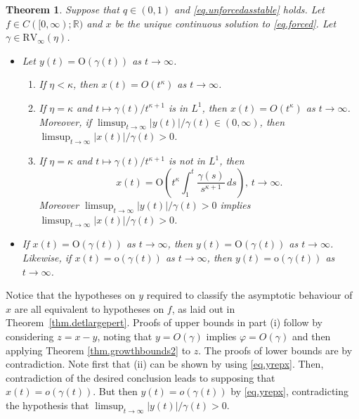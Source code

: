\documentclass[a4paper,10pt,reqno]{amsart}
\numberwithin{equation}{section}
\newtheorem{theorem}{Theorem}
\theoremstyle{definition}
\theoremstyle{remark}
\DeclareMathOperator{\1}{\mathbbm 1}
\begin{document}
\begin{theorem} \label{thm.smallstochpert}
Suppose that $q\in (0,1)$ and \eqref{eq.unforcedasstable} holds. Let $f\in C([0,\infty);\mathbb{R})$ and $x$ be the unique continuous solution to \eqref{eq.forced}. Let $\gamma\in \text{RV}_\infty(\eta)$. 
\begin{itemize}
	\item[(i)] Let $y(t)=\text{O}(\gamma(t))$ as $t\to\infty$.
	\begin{enumerate}
		\item[(A)] 
		If $\eta< \kappa$, then $x(t)=O(t^\kappa)$ as $t\to\infty$.
		\item[(B)] If $\eta=\kappa$ and  $t\mapsto \gamma(t)/t^{\kappa+1}$ is in $L^1$, then 
		$x(t)=O(t^\kappa)$ as $t\to\infty$.
		Moreover, if $\limsup_{t\to\infty} |y(t)|/\gamma(t)\in (0,\infty)$, then $\limsup_{t\to\infty} |x(t)|/\gamma(t)>0$.
		\item[(C)] If $\eta=\kappa$ and  $t\mapsto\gamma(t)/t^{\kappa+1}$ is not in $L^1$, then 
		\[
		x(t)=\text{O}\left(t^\kappa\int_1^t \frac{\gamma(s)}{s^{\kappa+1}}\,ds\right), \,t\to\infty.
		\]
		Moreover $\limsup_{t\to\infty} |y(t)|/\gamma(t)>0$ implies  $\limsup_{t\to\infty} |x(t)|/\gamma(t)>0$.  
	\end{enumerate}  
	\item[(ii)] \hspace{0.1in} If $x(t)=\text{O}(\gamma(t))$ as $t\to\infty$, then $y(t)=\text{O}(\gamma(t))$ as $t\to\infty$. Likewise, if $x(t)=\text{o}(\gamma(t))$ as $t\to\infty$, then $y(t)=\text{o}(\gamma(t))$ as $t\to\infty$.   
\end{itemize}
\end{theorem}
Notice that the hypotheses on $y$ required to classify the asymptotic behaviour of $x$ are all equivalent to hypotheses on  $f$, as laid out in Theorem~\ref{thm.detlargepert}. Proofs of upper bounds in part (i) follow by considering $z=x-y$, noting that $y=O(\gamma)$ implies $\varphi=O(\gamma)$ and then applying Theorem \ref{thm.growthbounds2} to $z$. The proofs of lower bounds are by contradiction. Note first that (ii) can be shown by using \eqref{eq.yrepx}. Then, contradiction of the desired conclusion leads to supposing that $x(t)=o(\gamma(t))$. But then $y(t)=o(\gamma(t))$ by \eqref{eq.yrepx}, contradicting the hypothesis that $\limsup_{t\to\infty} |y(t)|/\gamma(t)>0$.
\end{document}
